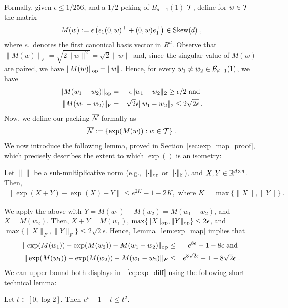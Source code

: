 Formally, given $\epsilon \le 1/256$, and a $1/2$ pcking of  $B_{d-1}(1)$ $\mathcal{T}$, define for $w \in \mathcal{T}$ the matrix
\begin{eqnarray*}
M(w) := \epsilon \left(e_1(0,w)^\top + (0,w)e_1^\top\right) \in \mathrm{Skew}(d)~,
\end{eqnarray*}
where $e_1$ denotes the first canonical basis vector in $R^d$. Observe that $\|M(w)\|_F = \sqrt{2\|w\|^2} = \sqrt{2}\|w\|$ and, since the singular value of $M(w)$ are paired, we have $\|M(w)\|_{\mathrm{op}} = \|w\|$. Hence, for every $w_1 \ne w_2 \in \mathcal{B}_{d-1}(1)$, we have
\begin{eqnarray*}
\|M(w_1-w_2)\|_{\mathrm{op}} &=& \epsilon \|w_1 - w_2\|_{2} \ge \epsilon /2 ~\text{and}~ \\
\lVert M(w_1-w_2) \rVert_{\mathrm{F}} &=&\sqrt{2}\epsilon \|w_1 - w_2\|_{2}  \le 2\sqrt{2\epsilon} \:.
\end{eqnarray*}
Now, we define our packing $\overline{\mathcal{N}}$ formally as
\begin{eqnarray*}
\overline{\mathcal{N}} := \{\exp(M(w)): w \in \mathcal{T}\} \:.
\end{eqnarray*}
We now introduce the following lemma, proved in Section~\ref{sec:exp_map_proof}, which precisely describes the extent to which $\exp()$ is an isometry:
\begin{lem}\label{lem:exp_map} Let $\|\|$ be a sub-multiplicative norm (e.g., $\lVert \cdot \rVert_{\mathrm{op}}$ or $\lVert \cdot \rVert_{\mathrm{F}}$), and $X,Y \in \mathbb{R}^{d \times d}$. Then,
\begin{eqnarray}
\|\exp(X+Y) -\exp(X) - Y\| \le e^{2K} - 1 - 2K, \text{ where } K = \max\{\|X\|,\|Y\|\}~.
\end{eqnarray}
\end{lem}
We apply the above  with $Y = M(w_1) - M(w_2) = M(w_1 - w_2)$, and $X = M(w_2)$. Then, $X + Y = M(w_1)$, $\max\{\|X\|_{\mathrm{op}},\|Y\|_{\mathrm{op}}\} \le 2\epsilon$, and $\max\{\|X\|_{F},\|Y\|_{F}\} \le 2\sqrt{2}\epsilon$. Hence, Lemma~\ref{lem:exp_map} implies that
	\begin{equation}\label{eq:exp_diff}
	\begin{aligned}
	\|\exp(M(w_1))-\exp(M(w_2)) - M(w_1 - w_2)\|_{\mathrm{op}} &\le& e^{8\epsilon} - 1 - 8\epsilon \text{ and } \\
	\|\exp(M(w_1))-\exp(M(w_2)) - M(w_1 - w_2)\|_F &\le& e^{8\sqrt{2}\epsilon} - 1 - 8\sqrt{2}\epsilon ~.
	\end{aligned}
	\end{equation}
	We can upper bound both displays in ~\eqref{eq:exp_diff} using the following short technical lemma:
	\begin{lem}\label{claim:exp_claim} Let $t \in [0,\log 2]$. Then $e^t - 1 - t \le t^2$.
	\end{lem}
